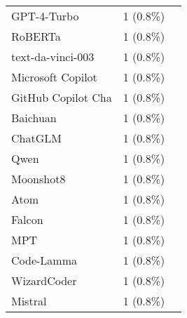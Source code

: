 \begin{table}[ht]
\begin{tabular}{l c p{4cm}}
		GPT-4-Turbo & 1 (0.8\%) & \cite{oli2024automated} \\
		RoBERTa & 1 (0.8\%) & \cite{oli2024automated} \\
		text-da-vinci-003 & 1 (0.8\%) & \cite{prather2024interactions} \\
		Microsoft Copilot & 1 (0.8\%) & \cite{agarwal2024which} \\
		GitHub Copilot Cha & 1 (0.8\%) & \cite{agarwal2024which} \\
		Baichuan & 1 (0.8\%) & \cite{xiao2024qacp} \\
		ChatGLM & 1 (0.8\%) & \cite{xiao2024qacp} \\
		Qwen & 1 (0.8\%) & \cite{xiao2024qacp} \\
		Moonshot8 & 1 (0.8\%) & \cite{xiao2024qacp} \\
		Atom & 1 (0.8\%) & \cite{xiao2024qacp} \\
		Falcon & 1 (0.8\%) & \cite{raihan2024cseprompts} \\
		MPT & 1 (0.8\%) & \cite{raihan2024cseprompts} \\
		Code-Lamma & 1 (0.8\%) & \cite{raihan2024cseprompts} \\
		WizardCoder & 1 (0.8\%) & \cite{raihan2024cseprompts} \\
		Mistral & 1 (0.8\%) & \cite{raihan2024cseprompts} \\
	\bottomrule
    \end{tabular}
    \label{tab:rq2}
\end{table}